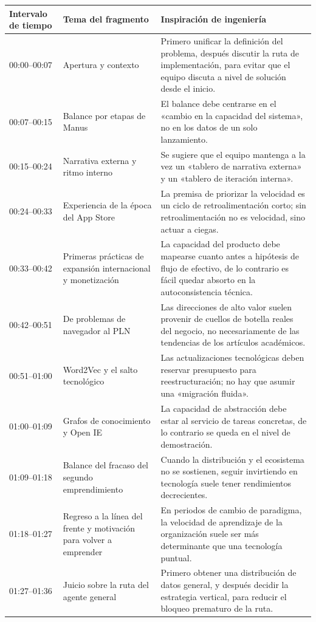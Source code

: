 \documentclass[a4paper]{article}
\begin{document}
\begin{longtable}{p{2.6cm}p{4.0cm}p{6.6cm}}
\toprule
Intervalo de tiempo & Tema del fragmento & Inspiración de ingeniería \\
\midrule
\endhead
00:00--00:07 & Apertura y contexto & Primero unificar la definición del problema, después discutir la ruta de implementación, para evitar que el equipo discuta a nivel de solución desde el inicio. \\
00:07--00:15 & Balance por etapas de Manus & El balance debe centrarse en el «cambio en la capacidad del sistema», no en los datos de un solo lanzamiento. \\
00:15--00:24 & Narrativa externa y ritmo interno & Se sugiere que el equipo mantenga a la vez un «tablero de narrativa externa» y un «tablero de iteración interna». \\
00:24--00:33 & Experiencia de la época del App Store & La premisa de priorizar la velocidad es un ciclo de retroalimentación corto; sin retroalimentación no es velocidad, sino actuar a ciegas. \\
00:33--00:42 & Primeras prácticas de expansión internacional y monetización & La capacidad del producto debe mapearse cuanto antes a hipótesis de flujo de efectivo, de lo contrario es fácil quedar absorto en la autoconsistencia técnica. \\
00:42--00:51 & De problemas de navegador al PLN & Las direcciones de alto valor suelen provenir de cuellos de botella reales del negocio, no necesariamente de las tendencias de los artículos académicos. \\
00:51--01:00 & Word2Vec y el salto tecnológico & Las actualizaciones tecnológicas deben reservar presupuesto para reestructuración; no hay que asumir una «migración fluida». \\
01:00--01:09 & Grafos de conocimiento y Open IE & La capacidad de abstracción debe estar al servicio de tareas concretas, de lo contrario se queda en el nivel de demostración. \\
01:09--01:18 & Balance del fracaso del segundo emprendimiento & Cuando la distribución y el ecosistema no se sostienen, seguir invirtiendo en tecnología suele tener rendimientos decrecientes. \\
01:18--01:27 & Regreso a la línea del frente y motivación para volver a emprender & En periodos de cambio de paradigma, la velocidad de aprendizaje de la organización suele ser más determinante que una tecnología puntual. \\
01:27--01:36 & Juicio sobre la ruta del agente general & Primero obtener una distribución de datos general, y después decidir la estrategia vertical, para reducir el bloqueo prematuro de la ruta. \\

\end{longtable}
\end{document}
